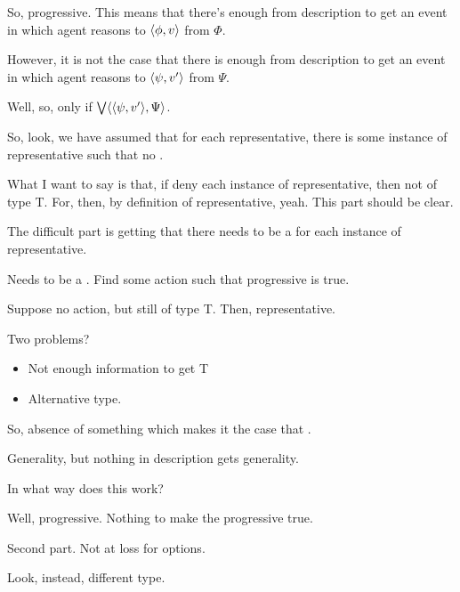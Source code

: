 \begin{note}
  So, progressive.
  This means that there's enough from description to get an event in which agent reasons to \(\langle \phi, v \rangle\) from \(\Phi\).

  However, it is not the case that there is enough from description to get an event in which agent reasons to \(\langle \psi, v' \rangle\) from \(\Psi\).

  Well, so, only if \(\bigvee\langle \langle \psi, v' \rangle, \Psi \rangle\).
\end{note}

\begin{note}
  So, look, we have assumed that for each representative, there is some instance of representative such that no \pevent{}.

  What I want to say is that, if deny each instance of representative, then not of type T.
  For, then, by definition of representative, yeah.
  This part should be clear.

  The difficult part is getting that there needs to be a \pevent{} for each instance of representative.

  Needs to be a \pevent{}.
  Find some action such that progressive is true.

  Suppose no action, but still of type T.
  Then, representative.
  
\end{note}

\begin{note}
  Two problems?

  \begin{itemize}
  \item
    Not enough information to get T
  \item
    Alternative type.
  \end{itemize}
\end{note}


\begin{note}
  \color{blue}
  So, absence of something which makes it the case that \pevent{}.
  
\end{note}

\begin{note}
  Generality, but nothing in description gets generality.

  In what way does this work?

  Well, progressive.
  Nothing to make the progressive true.
\end{note}

\begin{note}
  Second part.
  Not at loss for options.

  Look, instead, different type.
\end{note}



